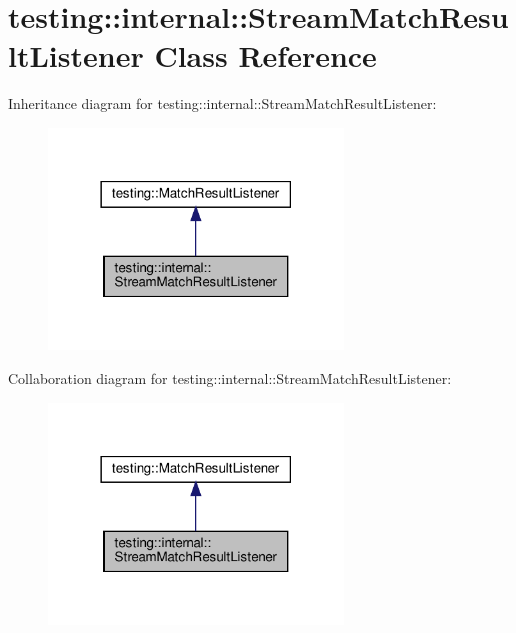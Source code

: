 \hypertarget{classtesting_1_1internal_1_1_stream_match_result_listener}{}\section{testing\+:\+:internal\+:\+:Stream\+Match\+Result\+Listener Class Reference}
\label{classtesting_1_1internal_1_1_stream_match_result_listener}


Inheritance diagram for testing\+:\+:internal\+:\+:Stream\+Match\+Result\+Listener\+:
\nopagebreak
\begin{figure}[H]
\begin{center}
\leavevmode
\includegraphics[width=222pt]{classtesting_1_1internal_1_1_stream_match_result_listener__inherit__graph}
\end{center}
\end{figure}


Collaboration diagram for testing\+:\+:internal\+:\+:Stream\+Match\+Result\+Listener\+:
\nopagebreak
\begin{figure}[H]
\begin{center}
\leavevmode
\includegraphics[width=222pt]{classtesting_1_1internal_1_1_stream_match_result_listener__coll__graph}
\end{center}
\end{figure}

